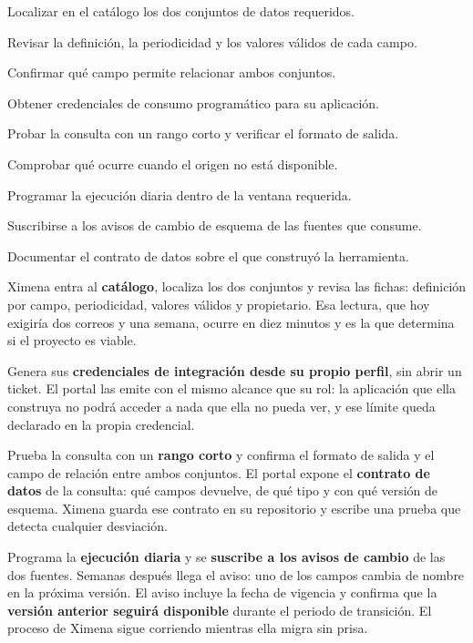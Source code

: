 \begin{uxpreg}
\item Localizar en el catálogo los dos conjuntos de datos requeridos.
\item Revisar la definición, la periodicidad y los valores válidos de cada campo.
\item Confirmar qué campo permite relacionar ambos conjuntos.
\item Obtener credenciales de consumo programático para su aplicación.
\item Probar la consulta con un rango corto y verificar el formato de salida.
\item Comprobar qué ocurre cuando el origen no está disponible.
\item Programar la ejecución diaria dentro de la ventana requerida.
\item Suscribirse a los avisos de cambio de esquema de las fuentes que consume.
\item Documentar el contrato de datos sobre el que construyó la herramienta.
\end{uxpreg}


Ximena entra al \textbf{catálogo}, localiza los dos conjuntos y revisa las fichas: definición
por campo, periodicidad, valores válidos y propietario. Esa lectura, que hoy exigiría dos
correos y una semana, ocurre en diez minutos y es la que determina si el proyecto es viable.

Genera sus \textbf{credenciales de integración desde su propio perfil}, sin abrir un ticket. El
portal las emite con el mismo alcance que su rol: la aplicación que ella construya no podrá
acceder a nada que ella no pueda ver, y ese límite queda declarado en la propia credencial.

Prueba la consulta con un \textbf{rango corto} y confirma el formato de salida y el campo de
relación entre ambos conjuntos. El portal expone el \textbf{contrato de datos} de la consulta:
qué campos devuelve, de qué tipo y con qué versión de esquema. Ximena guarda ese contrato en su
repositorio y escribe una prueba que detecta cualquier desviación.

Programa la \textbf{ejecución diaria} y se \textbf{suscribe a los avisos de cambio} de las dos
fuentes. Semanas después llega el aviso: uno de los campos cambia de nombre en la próxima
versión. El aviso incluye la fecha de vigencia y confirma que la \textbf{versión anterior
seguirá disponible} durante el periodo de transición. El proceso de Ximena sigue corriendo
mientras ella migra sin prisa.


